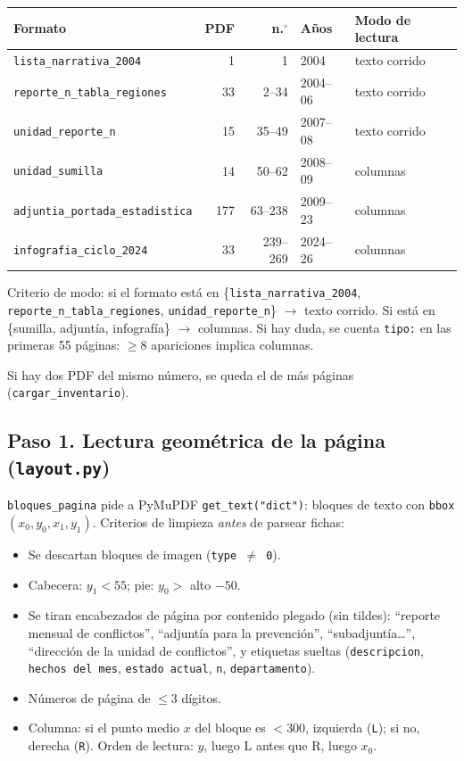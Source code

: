 \documentclass[11pt,a4paper]{article}
\begin{document}
\begin{center}
\renewcommand{\arraystretch}{1.15}
\begin{tabular}{@{}lrrll@{}}
\toprule
\textbf{Formato} & \textbf{PDF} & \textbf{n.$^\circ$} & \textbf{Años} & \textbf{Modo de lectura} \\
\midrule
\texttt{lista\_narrativa\_2004} & 1 & 1 & 2004 & texto corrido \\
\texttt{reporte\_n\_tabla\_regiones} & 33 & 2--34 & 2004--06 & texto corrido \\
\texttt{unidad\_reporte\_n} & 15 & 35--49 & 2007--08 & texto corrido \\
\texttt{unidad\_sumilla} & 14 & 50--62 & 2008--09 & columnas \\
\texttt{adjuntia\_portada\_estadistica} & 177 & 63--238 & 2009--23 & columnas \\
\texttt{infografia\_ciclo\_2024} & 33 & 239--269 & 2024--26 & columnas \\
\bottomrule
\end{tabular}
\end{center}

Criterio de modo: si el formato está en \{\texttt{lista\_narrativa\_2004}, \texttt{reporte\_n\_tabla\_regiones}, \texttt{unidad\_reporte\_n}\} $\to$ texto corrido. Si está en \{sumilla, adjuntía, infografía\} $\to$ columnas. Si hay duda, se cuenta \texttt{tipo:} en las primeras 55 páginas: $\ge 8$ apariciones implica columnas.

Si hay dos PDF del mismo número, se queda el de más páginas (\texttt{cargar\_inventario}).

\subsection{Paso 1. Lectura geométrica de la página (\texttt{layout.py})}

\texttt{bloques\_pagina} pide a PyMuPDF \texttt{get\_text("dict")}: bloques de texto con \texttt{bbox} $(x_0,y_0,x_1,y_1)$. Criterios de limpieza \emph{antes} de parsear fichas:

\begin{itemize}
  \item Se descartan bloques de imagen (\texttt{type $\ne$ 0}).
  \item Cabecera: $y_1 < 55$; pie: $y_0 >$ alto $-50$.
  \item Se tiran encabezados de página por contenido plegado (sin tildes): ``reporte mensual de conflictos'', ``adjuntía para la prevención'', ``subadjuntía\ldots'', ``dirección de la unidad de conflictos'', y etiquetas sueltas (\texttt{descripcion}, \texttt{hechos del mes}, \texttt{estado actual}, \texttt{n}, \texttt{departamento}).
  \item Números de página de $\le 3$ dígitos.
  \item Columna: si el punto medio $x$ del bloque es $< 300$, izquierda (\texttt{L}); si no, derecha (\texttt{R}). Orden de lectura: $y$, luego L antes que R, luego $x_0$.
\end{itemize}
\end{document}
